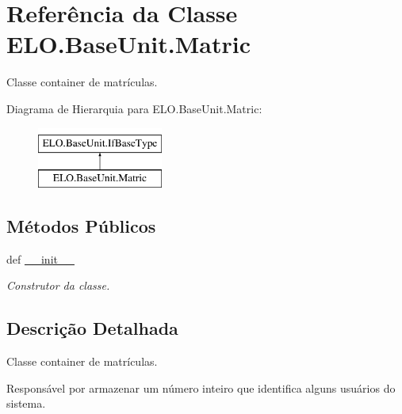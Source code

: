 \hypertarget{classELO_1_1BaseUnit_1_1Matric}{\section{Referência da Classe E\-L\-O.\-Base\-Unit.\-Matric}
\label{classELO_1_1BaseUnit_1_1Matric}
}


Classe container de matrículas.  


Diagrama de Hierarquia para E\-L\-O.\-Base\-Unit.\-Matric\-:\begin{figure}[H]
\begin{center}
\leavevmode
\includegraphics[height=2.000000cm]{d6/db2/classELO_1_1BaseUnit_1_1Matric}
\end{center}
\end{figure}
\subsection*{Métodos Públicos}
\begin{DoxyCompactItemize}
\item 
def \hyperlink{classELO_1_1BaseUnit_1_1Matric_a050299f6e8d99a530a4598270b93b8d9}{\-\_\-\-\_\-init\-\_\-\-\_\-}
\begin{DoxyCompactList}\small\item\em Construtor da classe. \end{DoxyCompactList}\end{DoxyCompactItemize}


\subsection{Descrição Detalhada}
Classe container de matrículas. 

Responsável por armazenar um número inteiro que identifica alguns usuários do sistema. 

